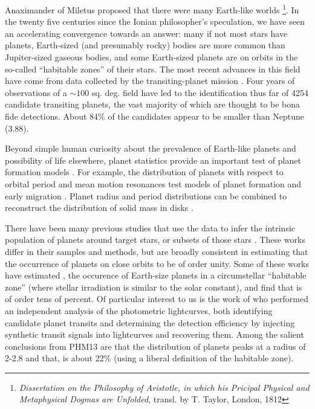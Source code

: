Anaximander of Miletus proposed that there were many Earth-like worlds
\footnote{{\it Dissertation on the Philosophy of Aristotle, in which
    his Pricipal Physical and Metaphysical Dogmas are Unfolded},
  transl. by T. Taylor, London, 1812}.  In the twenty five centuries
since the Ionian philosopher's speculation, we have seen an
accelerating convergence towards an answer: many if not most stars
have planets, Earth-sized (and presumably rocky) bodies are more 
common than Jupiter-sized gaseous bodies, and
some Earth-sized planets are on orbits in the so-called
``habitable zones'' of their stars. The most recent advances in this
field have come from data collected by the \kep{} transiting-planet
mission \citep{Borucki2010}.  Four years of observations of a $\sim
100$ sq. deg. field have led to the identification thus far
of 4254 candidate transiting planets, the vast majority of
which are thought to be bona fide detections. About 84\% of the
candidates appear to be smaller than Neptune (3.88\rearth{}).

Beyond simple human curiosity about the prevalence of Earth-like
planets and possibility of life elsewhere, planet statistics provide
an important test of planet formation models \citep[e.g.][]{Benz2014}.
For example, the distribution of planets with respect to orbital
period and mean motion resonances test models of planet formation and
early migration \citep[e.g.,][]{HansenMurray,Baruteau2013}.  Planet
radius and period distributions can be combined to reconstruct the
distribution of solid mass in disks
\citep[e.g.,][]{Chiang2013,Raymond2014}.

There have been many previous studies that use the \kep{} data to
infer the intrinsic population of planets around \kep{} target stars,
or subsets of those stars
\citep[e.g.][]{Catanzarite,Youdin,Traub2012,Howard2012,Fressin2013,
  Dressing2013,Gaidos2013,Dong2013,Kopparapu2013b,Petigura2013}.
These works differ in their samples and methods, but are broadly
consistent in estimating that the occurrence of planets on close
orbits to be of order unity.  Some of these works have estimated \ee{}, the
occurence of Earth-size planets in a circumstellar ``habitable zone''
(where stellar irradiation is similar to the solar constant), and find
that \ee{} is of order tens of percent.  Of particular interest to us
is the work of \citet[][hereafter PHM13]{Petigura2013} who performed
an independent analysis of the \kep{} photometric lightcurves, both
identifying candidate planet transits and determining the detection
efficiency by injecting synthetic transit signals into \kep{}
lightcurves and recovering them.  Among the salient conclusions from
PHM13 are that the distribution of planets peaks at a radius of
2-2.8\rearth{} and that, \ee{} is about 22\% (using a liberal
definition of the habitable zone).

